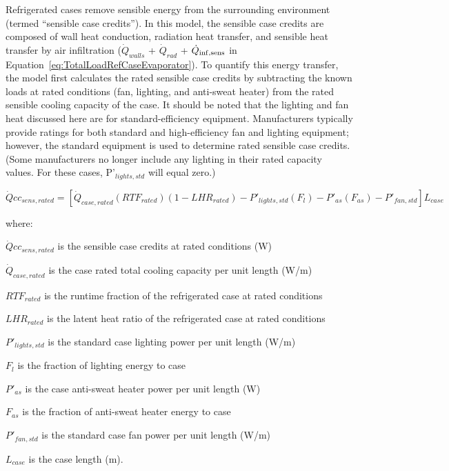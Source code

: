 Refrigerated cases remove sensible energy from the surrounding environment (termed ``sensible case credits''). In this model, the sensible case credits are composed of wall heat conduction, radiation heat transfer, and sensible heat transfer by air infiltration (\({\dot Q_{walls}}\) + \({\dot Q_{rad}}\) + \({\dot Q_{{\rm{inf,sens}}}}\) in Equation~\ref{eq:TotalLoadRefCaseEvaporator}). To quantify this energy transfer, the model first calculates the rated sensible case credits by subtracting the known loads at rated conditions (fan, lighting, and anti-sweat heater) from the rated sensible cooling capacity of the case. It should be noted that the lighting and fan heat discussed here are for standard-efficiency equipment. Manufacturers typically provide ratings for both standard and high-efficiency fan and lighting equipment; however, the standard equipment is used to determine rated sensible case credits. (Some manufacturers no longer include any lighting in their rated capacity values. For these cases, P'\(_{lights,std}\) will equal zero.)

\begin{equation}
\dot Qc{c_{sens,rated}} = \left[ {{{\dot Q}_{case,rated}}\left( {RT{F_{rated}}} \right)\left( {1 - LH{R_{rated}}} \right) - {P'}_{lights,std}\left( {{F_l}} \right) - {P'}_{as}\left( {{F_{as}}} \right) - {P'}_{fan,std}} \right]{L_{case}}
\end{equation}

where:

\(\dot Qc{c_{sens,rated}}\) is the sensible case credits at rated conditions (W)

\({\dot Q_{case,rated}}\) is the case rated total cooling capacity per unit length (W/m)

\(RT{F_{rated}}\) is the runtime fraction of the refrigerated case at rated conditions

\(LH{R_{rated}}\) is the latent heat ratio of the refrigerated case at rated conditions

\({P'}_{lights,std}\) is the standard case lighting power per unit length (W/m)

\({F_l}\) is the fraction of lighting energy to case

\({P'}_{as}\) is the case anti-sweat heater power per unit length (W)

\({F_{as}}\) is the fraction of anti-sweat heater energy to case

\({P'}_{fan,std}\) is the standard case fan power per unit length (W/m)

\({L_{case}}\) is the case length (m).

